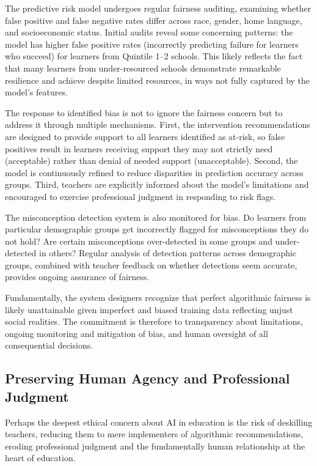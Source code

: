 \documentclass[12pt,a4paper]{article}
\begin{document}
The predictive risk model undergoes regular fairness auditing, examining whether false positive and false negative rates differ across race, gender, home language, and socioeconomic status. Initial audits reveal some concerning patterns: the model has higher false positive rates (incorrectly predicting failure for learners who succeed) for learners from Quintile 1--2 schools. This likely reflects the fact that many learners from under-resourced schools demonstrate remarkable resilience and achieve despite limited resources, in ways not fully captured by the model's features.

The response to identified bias is not to ignore the fairness concern but to address it through multiple mechanisms. First, the intervention recommendations are designed to provide support to all learners identified as at-risk, so false positives result in learners receiving support they may not strictly need (acceptable) rather than denial of needed support (unacceptable). Second, the model is continuously refined to reduce disparities in prediction accuracy across groups. Third, teachers are explicitly informed about the model's limitations and encouraged to exercise professional judgment in responding to risk flags.

The misconception detection system is also monitored for bias. Do learners from particular demographic groups get incorrectly flagged for misconceptions they do not hold? Are certain misconceptions over-detected in some groups and under-detected in others? Regular analysis of detection patterns across demographic groups, combined with teacher feedback on whether detections seem accurate, provides ongoing assurance of fairness.

Fundamentally, the system designers recognize that perfect algorithmic fairness is likely unattainable given imperfect and biased training data reflecting unjust social realities. The commitment is therefore to transparency about limitations, ongoing monitoring and mitigation of bias, and human oversight of all consequential decisions.

\subsection{Preserving Human Agency and Professional Judgment}

Perhaps the deepest ethical concern about AI in education is the risk of deskilling teachers, reducing them to mere implementers of algorithmic recommendations, eroding professional judgment and the fundamentally human relationship at the heart of education.
\end{document}
